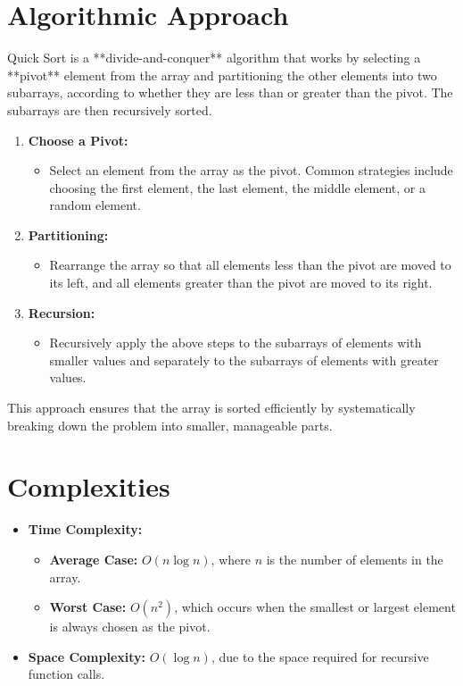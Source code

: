 \section*{Algorithmic Approach}
Quick Sort is a **divide-and-conquer** algorithm that works by selecting a **pivot** element from the array and partitioning the other elements into two subarrays, according to whether they are less than or greater than the pivot. The subarrays are then recursively sorted.

\begin{enumerate}
    \item \textbf{Choose a Pivot:}
    \begin{itemize}
        \item Select an element from the array as the pivot. Common strategies include choosing the first element, the last element, the middle element, or a random element.
    \end{itemize}
    
    \item \textbf{Partitioning:}
    \begin{itemize}
        \item Rearrange the array so that all elements less than the pivot are moved to its left, and all elements greater than the pivot are moved to its right.
    \end{itemize}
    
    \item \textbf{Recursion:}
    \begin{itemize}
        \item Recursively apply the above steps to the subarrays of elements with smaller values and separately to the subarrays of elements with greater values.
    \end{itemize}
\end{enumerate}

This approach ensures that the array is sorted efficiently by systematically breaking down the problem into smaller, manageable parts.


\section*{Complexities}

\begin{itemize}
    \item \textbf{Time Complexity:} 
    \begin{itemize}
        \item \textbf{Average Case:} \(O(n \log n)\), where \(n\) is the number of elements in the array.
        \item \textbf{Worst Case:} \(O(n^2)\), which occurs when the smallest or largest element is always chosen as the pivot.
    \end{itemize}
    
    \item \textbf{Space Complexity:} \(O(\log n)\), due to the space required for recursive function calls.
\end{itemize}

